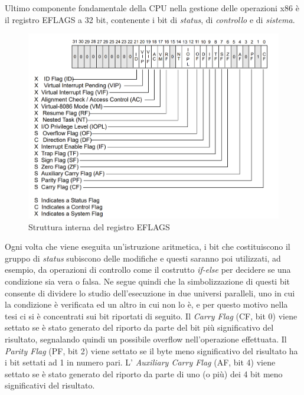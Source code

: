 \documentclass[Lau, oneside]{sapthesis}%
\begin{document}
\newpage
Ultimo componente fondamentale della CPU nella gestione delle operazioni x86 è il registro EFLAGS a 32 bit, contenente i bit di \textit{status}, di \textit{controllo} e di \textit{sistema}.
\begin{figure}[h]
\centering
\includegraphics[width=0.786\linewidth]{foto/registro_eflags.png}
\caption{Struttura interna del registro EFLAGS \cite{ref:manuale_intel_1}}
\label{fig:registro_eflags}
\end{figure}
\newline
Ogni volta che viene eseguita un'istruzione aritmetica, i bit che costituiscono il gruppo di \textit{status} subiscono delle modifiche e questi saranno poi utilizzati, ad esempio, da operazioni di controllo come il costrutto \textit{if-else} per decidere se una condizione sia vera o falsa.
\newline
Ne segue quindi che la simbolizzazione di questi bit consente di dividere lo studio dell'esecuzione in due universi paralleli, uno in cui la condizione è verificata ed un altro in cui non lo è, e per questo motivo nella tesi ci si è concentrati sui bit riportati di seguito.
\newline \newline
Il \textit{Carry Flag} (CF, bit 0) viene settato se è stato generato del riporto da parte del bit più significativo del risultato, segnalando quindi un possibile overflow nell'operazione effettuata.
\newline \newline
Il \textit{Parity Flag} (PF, bit 2) viene settato se il byte meno significativo del risultato ha i bit settati ad 1 in numero pari.
\newline \newline
L' \textit{Auxiliary Carry Flag} (AF, bit 4) viene settato se è stato generato del riporto da parte di uno (o più) dei 4 bit meno significativi del risultato.
\end{document}
